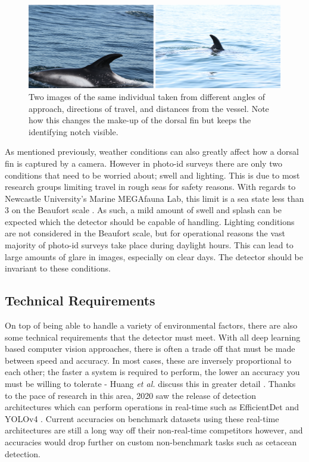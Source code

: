    \begin{figure}
 	\begin{center}
 		\includegraphics[scale=0.6]{Chapter3/figs/angle-size-example.png}
 	\end{center}
 	\caption{Two images of the same individual taken from different angles of approach, directions of travel, and distances from the vessel. Note how this changes the make-up of the dorsal fin but keeps the identifying notch visible. 
 	}
 	\label{fig:angle-eg}
 \end{figure}
 
 As mentioned previously, weather conditions can also greatly affect how a dorsal fin is captured by a camera. However in photo-id surveys there are only two conditions that need to be worried about; swell and lighting. This is due to most research groups limiting travel in rough seas for safety reasons. With regards to Newcastle University's Marine MEGAfauna Lab, this limit is a sea state less than 3 on the Beaufort scale \cite{world_meteorologicial_society_beaufort_1970}. As such, a mild amount of swell and splash can be expected which the detector should be capable of handling. Lighting conditions are not considered in the Beaufort scale, but for operational reasons the vast majority of photo-id surveys take place during daylight hours. This can lead to large amounts of glare in images, especially on clear days. The detector should be invariant to these conditions. 
 
 \subsection{Technical Requirements}\label{ch:cetDet,sec:requirements,sub:technical}
 
On top of being able to handle a variety of environmental factors, there are also some technical requirements that the detector must meet. With all deep learning based computer vision approaches, there is often a trade off that must be made between speed and accuracy. In most cases, these are inversely proportional to each other; the faster a system is required to perform, the lower an accuracy you must be willing to tolerate - Huang \textit{et al.} discuss this in greater detail \cite{huang_speedaccuracy_2017}. Thanks to the pace of research in this area, 2020 saw the release of detection architectures which can perform operations in real-time such as EfficientDet \cite{tan_efficientdet_2020} and YOLOv4 \cite{bochkovskiy_yolov4_2020}. Current accuracies on benchmark datasets using these real-time architectures are still a long way off their non-real-time competitors however, and accuracies would drop further on custom non-benchmark tasks such as cetacean detection. 
 
